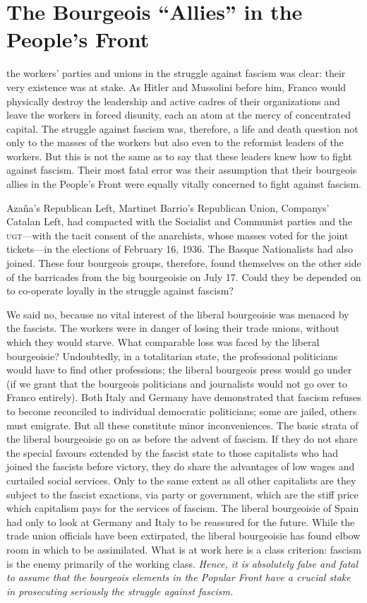 \chapter{The Bourgeois “Allies” in the People's Front}

 the workers’ parties and unions in the struggle against fascism was clear: their very existence was at stake. As Hitler and Mussolini before him, Franco would physically destroy the leadership and active cadres of their organizations and leave the workers in forced disunity, each an atom at the mercy of concentrated capital. The struggle against fascism was, therefore, a life and death question not only to the masses of the workers but also even to the reformist leaders of the workers. But this is not the same as to say that these leaders knew how to fight against fascism. Their most fatal error was their assumption that their bourgeois allies in the People’s Front were equally vitally concerned to fight against fascism.

Azaña's Republican Left, Martinet Barrio's Republican Union, Companys' Catalan Left, had compacted with the Socialist and Communist parties and the \textsc{ugt}---with the tacit consent of the anarchists, whose masses voted for the joint tickets---in the elections of February 16, 1936. The Basque Nationalists had also joined. These four bourgeois groups, therefore, found themselves on the other side of the barricades from the big bourgeoisie on July 17. Could they be depended on to co-operate loyally in the struggle against fascism?

We said no, because no vital interest of the liberal bourgeoisie was menaced by the fascists. The workers were in danger of losing their trade unions, without which they would starve. What comparable loss was faced by the liberal bourgeoisie? Undoubtedly, in a totalitarian state, the professional politicians would have to find other professions; the liberal bourgeois press would go under (if we grant that the bourgeois politicians and journalists would not go over to Franco entirely). Both Italy and Germany have demonstrated that fascism refuses to become reconciled to individual democratic politicians; some are jailed, others must emigrate. But all these constitute minor inconveniences. The basic strata of the liberal bourgeoisie go on as before the advent of fascism. If they do not share the special favours extended by the fascist state to those capitalists who had joined the fascists before victory, they do share the advantages of low wages and curtailed social services. Only to the same extent as all other capitalists are they subject to the fascist exactions, via party or government, which are the stiff price which capitalism pays for the services of fascism. The liberal bourgeoisie of Spain had only to look at Germany and Italy to be reassured for the future. While the trade union officials have been extirpated, the liberal bourgeoisie has found elbow room in which to be assimilated. What is at work here is a class criterion: fascism is the enemy primarily of the working class. \emph{Hence, it is absolutely false and fatal to assume that the bourgeois elements in the Popular Front have a crucial stake in prosecuting seriously the struggle against fascism.}

